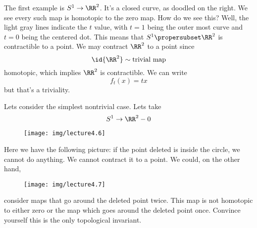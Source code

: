 The first example is $S^{1}\to\RR^2$. It's a closed curve, as
doodled on the right. We see every such map is homotopic to the
zero map. How do we see this? Well, the light gray lines indicate
the $t$ value, with $t=1$ being the outer most curve and $t=0$
being the centered dot. This means that $S^{1}\propersubset\RR^2$  
is contractible to a point. We may contract $\RR^2$ to a point
since
\begin{equation}
\id{\RR^2}\homotopic\mbox{trivial map}
\end{equation}
homotopic, which implies $\RR^{2}$ is contractible. We can write 
\begin{equation}
f_{t}(x)=tx
\end{equation}
but that's a triviality.

Lets consider the simplest nontrivial case. Lets take
\begin{equation}
S^{1}\to\RR^{2}-0
\end{equation}

\begin{wrapfigure}{r}{2pc}
  \vspace{-20pt}
  \centering\texttt{[image: img/lecture4.6]}
  \vspace{-20pt}
\end{wrapfigure}
Here we have the following picture: if the point deleted is
inside the circle, we cannot do anything. We cannot contract it
to a point. We could, on the other hand, 

\begin{wrapfigure}{l}{4pc}
  \vspace{-16pt}
  \centering\texttt{[image: img/lecture4.7]}
  \vspace{-20pt}
\end{wrapfigure}
\noindent consider maps that go
around the deleted point twice. This map is not homotopic to
either zero or the map which goes around the deleted point
once. Convince yourself this is the only topological invariant.

